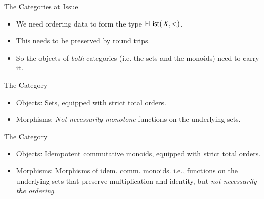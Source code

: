 \documentclass{beamer}
\begin{document}
\begin{frame}{The Categories at Issue}
\begin{itemize}
  \item We need ordering data to form the type $\AgdaDatatype{FList}(X,<)$.
  \item This needs to be preserved by round trips.
  \item So the objects of \emph{both} categories (i.e. the sets and the monoids) need to carry it.
\end{itemize}
\pause

\begin{block}{The Category }
\begin{itemize}
  \item Objects: Sets, equipped with strict total orders.
  \item Morphisms: \emph{Not-necessarily monotone} functions on the underlying sets.
\end{itemize}
\end{block}

\begin{block}{The Category }
\begin{itemize}
  \item Objects: Idempotent commutative monoids, equipped with strict total orders.
  \item Morphisms: Morphisms of idem. comm. monoids. i.e., functions on the underlying sets that preserve multiplication and identity, but \emph{not necessarily the ordering}.
\end{itemize}
\end{block}
\end{frame}
\end{document}
